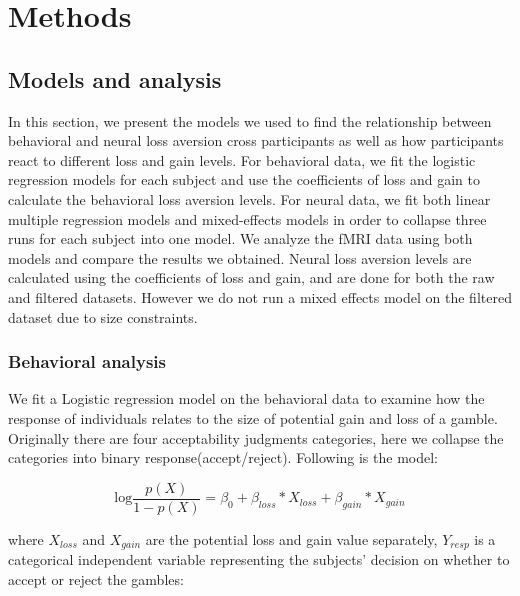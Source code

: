 \section{Methods}

\subsection{Models and analysis}

In this section, we present the models we used to find the relationship between behavioral and neural loss aversion cross participants as well as how participants react to different loss and gain levels. For behavioral data, we fit the logistic regression models for each subject and use the coefficients of loss and gain to calculate the behavioral loss aversion levels. For neural data, we fit both linear multiple regression models and mixed-effects models in order to collapse three runs for each subject into one model. We analyze the fMRI data using both models and compare the results we obtained. Neural loss aversion levels are calculated using the coefficients of loss and gain, and are done for both the raw and filtered datasets. However we do not run a mixed effects model on the filtered dataset due to size constraints.   

\subsubsection{Behavioral analysis}

We fit a Logistic regression model on the behavioral data to examine how the response of individuals relates to the size of potential gain and loss of a gamble. Originally there are four acceptability judgments categories, here we collapse the categories into binary response(accept/reject). Following is the model:

\begin{equation}
\textrm{log}\frac{p(X)}{1-p(X)} = \beta_0 + \beta_{loss} *X_{loss} + \beta_{gain} * X_{gain}
\end{equation}

where $X_{loss}$ and $X_{gain}$ are the potential loss and gain value separately, $Y_{resp}$ is a categorical independent variable representing the subjects' decision on whether to accept or reject the gambles:

